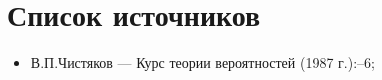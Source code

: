 \section*{Список источников}
\label{sec:sources}
\begin{itemize}
    \item[] В.П.Чистяков --- Курс теории вероятностей (1987 г.):--6;
\end{itemize}